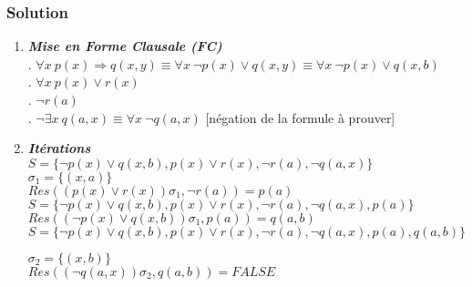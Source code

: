     \subsubsection*{Solution}
     \begin{enumerate}
    
   \item\textbf{\textit{ Mise en Forme Clausale (FC)}} \\
     . $\forall x \ p(x) \Rightarrow q(x, y) \equiv \forall x \ \neg p(x) \lor q(x,y) \equiv \forall x \ \neg p(x) \lor q(x,b)  $ \\
     . $\forall x \ p(x) \lor r(x) $ \\
     . $\neg r(a) $ \\
     . $\neg \exists x \ q(a, x) \equiv \forall x \ \neg q(a,x) $ [négation de la formule à prouver] \\
    
    
    \item\textbf{\textit{Itérations }} \\
    $ S = \{ \neg p(x) \lor q(x,b), p(x) \lor r(x), \neg r(a), \neg q(a,x) \} $\\
    $ \sigma_{1} = \{ (x,a) \}$\\
    $ Res( (p(x) \lor r(x))\sigma_{1}, \neg r(a) ) = p(a) $\\
    $ S = \{ \neg p(x) \lor q(x,b), p(x) \lor r(x), \neg r(a), \neg q(a,x), p(a) \} $\\
    $ Res( (\neg p(x) \lor q(x,b))\sigma_{1}, p(a) )= q(a,b) $\\
    $ S = \{ \neg p(x) \lor q(x,b), p(x) \lor r(x), \neg r(a), \neg q(a,x), p(a), q(a,b) \} $
    
    \noindent $ \sigma_{2} = \{ (x,b) \}$\\
    $ Res( (\neg q(a,x))\sigma_{2}, q(a,b) )= FALSE $\\
    

\end{enumerate}